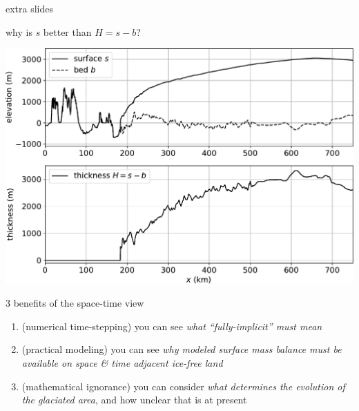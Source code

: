 \documentclass[10pt,dvipsnames]{beamer}
\begin{document}
\begin{frame}[standout]

extra slides
\end{frame}


\begin{frame}{why is $s$ better than $H=s-b$?}

\begin{center}
\includegraphics[height=0.84\textheight]{giscross}
\end{center}
\end{frame}


\begin{frame}{3 benefits of the space-time view}

\begin{enumerate}
\item \alert{(numerical time-stepping)} you can see \emph{what ``fully-implicit'' must mean}
\item \alert{(practical modeling)} you can see \emph{why modeled surface mass balance must be available on space \& time adjacent ice-free land}
\item \alert{(mathematical ignorance)} you can consider \emph{what determines the evolution of the glaciated area}, and how unclear that is at present
\end{enumerate}

\end{frame}
\end{document}
